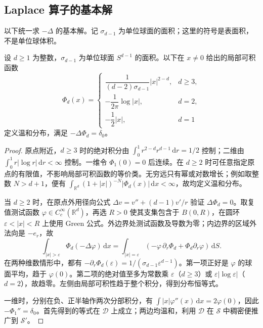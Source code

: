 \subsection{Laplace 算子的基本解}
\label{b2:subsec:050403}

以下统一求 \(-\Delta\) 的基本解。记 \(\sigma_{d-1}\) 为单位球面的面积；这里的符号是表面积，不是单位球体积。

\begin{theorem}\label{b2:thm:05-laplace-fundamental}
设 \(d\geq1\) 为整数，\(\sigma_{d-1}\) 为单位球面 \(S^{d-1}\) 的面积。以下在 \(x\ne0\) 给出的局部可积函数
\[
 \Phi_d(x)=
 \begin{cases}
 \dfrac1{(d-2)\sigma_{d-1}}|x|^{2-d},&d\geq3,\\[4pt]
 -\dfrac1{2\pi}\log|x|,&d=2,\\[4pt]
 -\dfrac12|x|,&d=1
 \end{cases}
\]
定义温和分布，满足 \(-\Delta\Phi_d=\delta_0\)。
\end{theorem}
\begin{proof}
原点附近，\(d\geq3\) 时的绝对积分由 \(\int_0^1r^{2-d}r^{d-1}\,\mathrm{d}r=1/2\) 控制；二维由 \(\int_0^1r|\log r|\,\mathrm{d}r<\infty\) 控制。一维令 \(\Phi_1(0)=0\) 后连续。在 \(d\geq2\) 时可任意指定原点的有限值，不影响局部可积函数的等价类。无穷远只有幂或对数增长；例如取整数 \(N>d+1\)，便有 \(\int_{\mathbb R^d}(1+|x|)^{-N}|\Phi_d(x)|\,\mathrm{d}x<\infty\)，故均定义温和分布。

当 \(d\geq2\) 时，在原点外用径向公式 \(\Delta v=v''+(d-1)v'/r\) 验证 \(\Delta\Phi_d=0\)。取复值测试函数 \(\varphi\in C_c^\infty(\mathbb R^d)\)，再选 \(R>0\) 使其支集包含于 \(B(0,R)\)，在圆环 \(\varepsilon<|x|<R\) 上使用 Green 公式。外边界处测试函数及导数为零；内边界的区域外法向是 \(-e_r\)，故
\[
 \int_{|x|>\varepsilon}\Phi_d(-\Delta\varphi)\,\mathrm{d}x
 =\int_{|x|=\varepsilon}
 \left(-\varphi\,\partial_r\Phi_d+\Phi_d\partial_r\varphi\right)\,\mathrm{d}S.
\]
在两种维数情形中，都有 \(-\partial_r\Phi_d(\varepsilon)=1/(\sigma_{d-1}\varepsilon^{d-1})\)。第一项正好是 \(\varphi\) 的球面平均，趋于 \(\varphi(0)\)。第二项的绝对值至多为常数乘 \(\varepsilon\)（\(d\geq3\)）或 \(\varepsilon|\log\varepsilon|\)（\(d=2\)），故趋零。左侧由局部可积性趋于整个积分，得到分布恒等式。

一维时，分别在负、正半轴作两次分部积分，有 \(\int |x|\varphi''(x)\,\mathrm{d}x=2\varphi(0)\)，因此 \(-\Phi_1''=\delta_0\)。首先得到的等式在 \(\mathcal D\) 上成立；两边均温和，利用 \(\mathcal D\) 在 \(\mathcal S\) 中稠密便推广到 \(\mathcal S'\)。
\end{proof}

